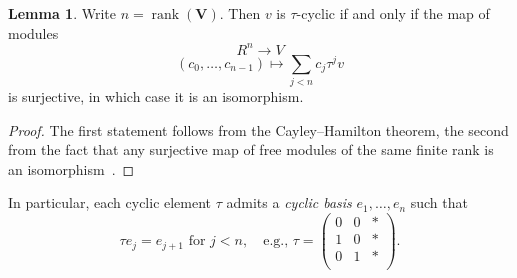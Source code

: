 \documentclass[reqno]{amsart}
\DeclareMathOperator{\rank}{rank}
\theoremstyle{plain} \newtheorem{theorem} {Theorem} \newtheorem{conjecture} {Conjecture} \newtheorem{corollary} [theorem] {Corollary} \newtheorem{proposition} [theorem] {Proposition} \newtheorem{fact} [theorem] {Fact}
\theoremstyle{definition} \newtheorem{definition} [theorem] {Definition}
\theoremstyle{itplain} %
\newtheorem{lemma}[theorem]{Lemma}
\begin{document}
\begin{lemma}\label{lemma:v-tau-cycl-if-only-if-map-modul-begin-rn-right-v-}
  Write $n = \rank(\mathbf{V})$.  Then $v$ is $\tau$-cyclic if and only if the map of modules
  \begin{equation}\label{eqn:rn-rightarrow-v}
    R^n \rightarrow V
  \end{equation}
  \begin{equation}\label{eqn:let-tau-in-c0-through-cn1-sum-cj-tau}
    (c_0,\dotsc,c_{n-1})  \mapsto \sum_{j < n} c_j \tau^j v
  \end{equation}
  is surjective, in which case it is an isomorphism.
\end{lemma}
\begin{proof}
  The first statement follows from the Cayley--Hamilton theorem, the second from the fact that any surjective map of free modules of the same finite rank is an isomorphism~\cite[Corollary 4.4a]{MR1322960}.
\end{proof}

In particular, each cyclic element $\tau$ admits a \emph{cyclic basis} $e_1, \dotsc, e_n$ such that
\begin{equation}\label{eqn:beginpmatrix-0--0--ast-}
  \tau e_j = e_{j+1} \text{ for } j < n,
  \quad
  \text{e.g., }
  \tau = 
  \begin{pmatrix}
    0 & 0 & \ast \\
    1 & 0 & \ast \\
    0 & 1 & \ast \\
  \end{pmatrix}.
\end{equation}
\end{document}
